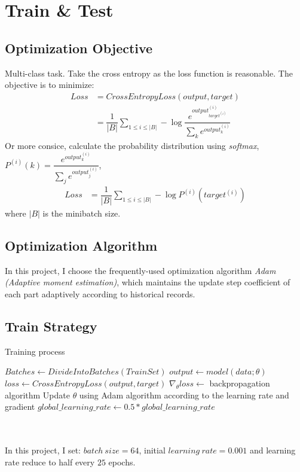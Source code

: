 \documentclass{article}
\begin{document}
\section{Train \& Test}
\subsection{Optimization Objective}
Multi-class task. Take the cross entropy as the loss function is reasonable. The objective is to minimize:
\begin{equation}
\begin{array}{ll}
    Loss &= CrossEntropyLoss(output, target)\\ 
    &= \dfrac{1}{|B|}\sum_{1\leq i\leq |B|} -\log \dfrac{e^{output^{(i)}_{target^{(i)}}}}{\sum_k e^{output^{(i)}_k}}
\end{array}
\end{equation}
Or more consice, calculate the probability distribution using \emph{softmax}, $P^{(i)}(k)=\dfrac{e^{output^{(i)}_k}}{\sum_j e^{output^{(i)}_j}}$,
\begin{equation}
\begin{array}{ll}
    Loss &= \dfrac{1}{|B|}\sum_{1\leq i\leq |B|} -\log P^{(i)}(target^{(i)})
\end{array}
\end{equation}
where $|B|$ is the minibatch size.

\subsection{Optimization Algorithm}
In this project, I choose the frequently-used optimization algorithm \emph{Adam (Adaptive moment estimation)}, which maintains the update step coefficient of each part adaptively according to historical records. 

\subsection{Train Strategy}
\begin{minipage}[htb]{0.8\linewidth}   
\begin{algorithm}[H]
\caption{Training process}
\begin{algorithmic}[1]
    \State $Batches \leftarrow DivideIntoBatches(TrainSet)$
        \State $output \leftarrow model(data; \theta)$
        \State $loss \leftarrow CrossEntropyLoss(output, target)$
        \State $\nabla_\theta loss \leftarrow$ backpropagation algorithm
        \State Update $\theta$ using Adam algorithm according to the learning rate and gradient
    \EndFor
        \State $global\_learning\_rate \leftarrow 0.5 * global\_learning\_rate$
    \EndIf
\EndFor
\end{algorithmic}
\end{algorithm}
\end{minipage}
~\\
~\\
In this project, I set: $batch\ size = 64$, initial $learning\ rate = 0.001$ and learning rate reduce to half every $25$ epochs.
\end{document}
